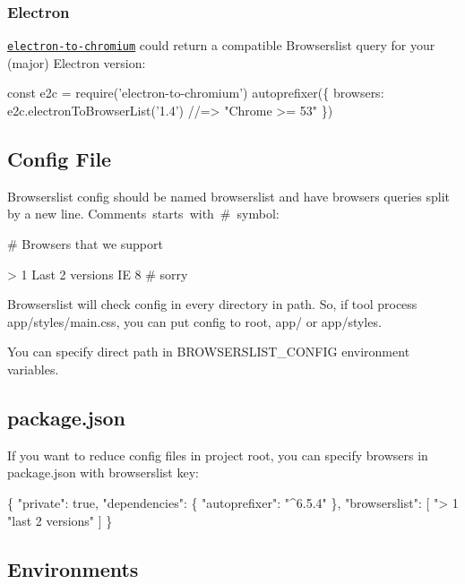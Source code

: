 \subsubsection*{Electron}

\href{https://www.npmjs.com/package/electron-to-chromium}{\tt {\ttfamily electron-\/to-\/chromium}} could return a compatible Browserslist query for your (major) Electron version\+:


\begin{DoxyCode}
const e2c = require('electron-to-chromium')
autoprefixer(\{
    browsers: e2c.electronToBrowserList('1.4') //=> "Chrome >= 53"
\})
\end{DoxyCode}


\subsection*{Config File}

Browserslist config should be named {\ttfamily browserslist} and have browsers queries split by a new line. Comments starts with {\ttfamily \#} symbol\+:


\begin{DoxyCode}
# Browsers that we support

> 1%
Last 2 versions
IE 8 # sorry
\end{DoxyCode}


Browserslist will check config in every directory in {\ttfamily path}. So, if tool process {\ttfamily app/styles/main.\+css}, you can put config to root, {\ttfamily app/} or {\ttfamily app/styles}.

You can specify direct path in {\ttfamily B\+R\+O\+W\+S\+E\+R\+S\+L\+I\+S\+T\+\_\+\+C\+O\+N\+F\+IG} environment variables.

\subsection*{{\ttfamily package.\+json}}

If you want to reduce config files in project root, you can specify browsers in {\ttfamily package.\+json} with {\ttfamily browserslist} key\+:


\begin{DoxyCode}
\{
  "private": true,
  "dependencies": \{
    "autoprefixer": "^6.5.4"
  \},
  "browserslist": [
    "> 1%
    "last 2 versions"
  ]
\}
\end{DoxyCode}


\subsection*{Environments}

